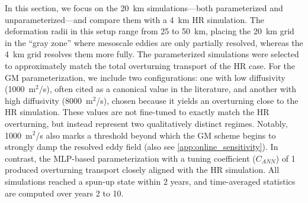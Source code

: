 \documentclass[draft]{agujournal2019}
\begin{document}
In this section, we focus on the 20~km simulations—both parameterized and unparameterized—and compare them with a 4~km HR simulation. The deformation radii in this setup range from 25 to 50~km, placing the 20~km grid in the ``gray zone'' where mesoscale eddies are only partially resolved, whereas the 4~km grid resolves them more fully. The parameterized simulations were selected to approximately match the total overturning transport of the HR case. For the GM parameterization, we include two configurations: one with low diffusivity (1000~m$^2$/s), often cited as a canonical value in the literature, and another with high diffusivity (8000~m$^2$/s), chosen because it yields an overturning close to the HR simulation. These values are not fine-tuned to exactly match the HR overturning, but instead represent two qualitatively distinct regimes. Notably, 1000~m$^2$/s also marks a threshold beyond which the GM scheme begins to strongly damp the resolved eddy field (also see \ref{app:online_sensitivity}).
In contrast, the MLP-based parameterization with a tuning coefficient ($C_{ANN}$) of 1  produced overturning transport closely aligned with the HR simulation. All simulations reached a spun-up state within 2 years, and time-averaged statistics are computed over years 2 to 10.

\end{document}
